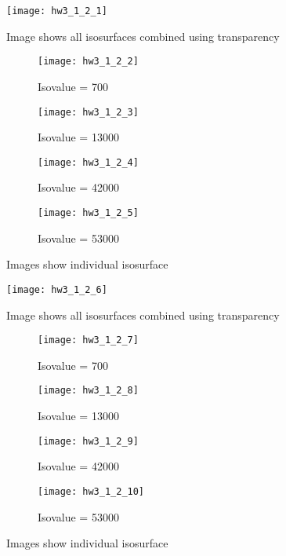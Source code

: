 \documentclass[11pt]{article}
\begin{document}
\begin{figure}[H]
\centering
\texttt{[image: hw3\_1\_2\_1]}
\caption{Image shows all isosurfaces combined using transparency}
\label{fig:hw3_1_2_1}
\end{figure}

\begin{figure}[H]
\begin{subfigure}{.5\textwidth}
  \centering
  \texttt{[image: hw3\_1\_2\_2]}
  \caption{Isovalue = 700}
  \label{fig:hw3_1_2_2}
\end{subfigure}
\begin{subfigure}{.5\textwidth}
  \centering
  \texttt{[image: hw3\_1\_2\_3]}
  \caption{Isovalue = 13000}
  \label{fig:hw3_1_2_3}
\end{subfigure}

\begin{subfigure}{.5\textwidth}
  \centering
  \texttt{[image: hw3\_1\_2\_4]}
  \caption{Isovalue = 42000}
  \label{fig:hw3_1_2_4}
\end{subfigure}
\begin{subfigure}{.5\textwidth}
  \centering
  \texttt{[image: hw3\_1\_2\_5]}
  \caption{Isovalue = 53000}
  \label{fig:hw3_1_2_5}
\end{subfigure}
\caption{Images show individual isosurface}
\label{}
\end{figure}

\begin{figure}[H]
\centering
\texttt{[image: hw3\_1\_2\_6]}
\caption{Image shows all isosurfaces combined using transparency}
\label{fig:hw3_1_2_6}
\end{figure}

\begin{figure}[H]
\begin{subfigure}{.5\textwidth}
  \centering
  \texttt{[image: hw3\_1\_2\_7]}
  \caption{Isovalue = 700}
  \label{fig:hw3_1_2_7}
\end{subfigure}
\begin{subfigure}{.5\textwidth}
  \centering
  \texttt{[image: hw3\_1\_2\_8]}
  \caption{Isovalue = 13000}
  \label{fig:hw3_1_2_8}
\end{subfigure}

\begin{subfigure}{.5\textwidth}
  \centering
  \texttt{[image: hw3\_1\_2\_9]}
  \caption{Isovalue = 42000}
  \label{fig:hw3_1_2_9}
\end{subfigure}
\begin{subfigure}{.5\textwidth}
  \centering
  \texttt{[image: hw3\_1\_2\_10]}
  \caption{Isovalue = 53000}
  \label{fig:hw3_1_2_10}
\end{subfigure}
\caption{Images show individual isosurface}
\label{}
\end{figure}
\end{document}
